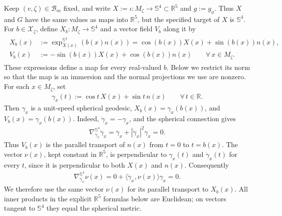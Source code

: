 \documentclass[a4paper,11pt,oneside,reqno]{amsart}
\numberwithin{equation}{section}
\theoremstyle{definition}
\begin{document}
Keep $(v,\zeta)\in\mathcal B_m$ fixed, and write
$X:=\iota:M_\zeta\to\mathbb S^4\subset\mathbb R^5$
and $g:=g_\phi$. Thus $X$ and $G$ have the same values
as maps into $\mathbb R^5$, but the specified target of
$X$ is $\mathbb S^4$. For $b\in\mathcal X_\zeta$, define
$X_b:M_\zeta\to\mathbb S^4$ and a vector field $V_b$
along it by
%
\begin{align}
    \label{eq:s4-transverse-graph}
    \begin{split}
        X_b(x)&:=\exp_{X(x)}^{\mathbb S^4}(b(x)n(x))
        =\cos(b(x))X(x)+\sin(b(x))n(x),\\
        V_b(x)&:=-\sin(b(x))X(x)+\cos(b(x))n(x)
        \qquad\forall\,x\in M_\zeta.
    \end{split}
\end{align}
%
These expressions define a map for every real-valued $b$.
Below we restrict its norm so that the map is an immersion
and the normal projections we use are nonzero. For each
$x\in M_\zeta$, set
%
\begin{align*}
    \gamma_x(t):=\cos t\,X(x)+\sin t\,n(x)
    \qquad\forall\,t\in\mathbb R.
\end{align*}
%
Then $\gamma_x$ is a unit-speed spherical geodesic,
$X_b(x)=\gamma_x(b(x))$, and
$V_b(x)=\dot\gamma_x(b(x))$. Indeed,
$\ddot\gamma_x=-\gamma_x$, and the spherical connection gives
%
\begin{align*}
    \nabla^{\mathbb S^4}_{\dot\gamma_x}\dot\gamma_x
    =\ddot\gamma_x+|\dot\gamma_x|^2\gamma_x=0.
\end{align*}
%
Thus $V_b(x)$ is the parallel transport of $n(x)$ from
$t=0$ to $t=b(x)$. The vector $\nu(x)$, kept constant in
$\mathbb R^5$, is perpendicular to $\gamma_x(t)$ and
$\dot\gamma_x(t)$ for every $t$, since it is perpendicular
to both $X(x)$ and $n(x)$. Consequently
%
\begin{align*}
    \nabla^{\mathbb S^4}_{\dot\gamma_x}\nu(x)
    =0+\langle\dot\gamma_x,\nu(x)\rangle\gamma_x=0.
\end{align*}
%
We therefore use the same vector $\nu(x)$ for its parallel
transport to $X_b(x)$. All inner products in the explicit
$\mathbb R^5$ formulas below are Euclidean; on vectors
tangent to $\mathbb S^4$ they equal the spherical metric.
\end{document}
